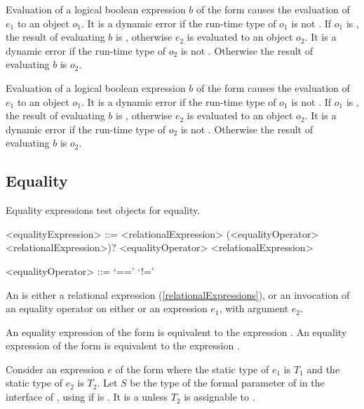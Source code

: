 \documentclass[makeidx]{article}
\begin{document}
\LMHash{}%
Evaluation of a logical boolean expression $b$ of the form
causes the evaluation of $e_1$ to an object $o_1$.
It is a dynamic error if the run-time type of $o_1$ is not .
If $o_1$ is \TRUE, the result of evaluating $b$ is \TRUE,
otherwise $e_2$ is evaluated to an object $o_2$.
It is a dynamic error if the run-time type of $o_2$ is not .
Otherwise the result of evaluating $b$ is $o_2$.

\LMHash{}%
Evaluation of a logical boolean expression $b$ of the form
causes the evaluation of $e_1$ to an object $o_1$.
It is a dynamic error if the run-time type of $o_1$ is not .
If $o_1$ is \FALSE, the result of evaluating $b$ is \FALSE,
otherwise $e_2$ is evaluated to an object $o_2$.
It is a dynamic error if the run-time type of $o_2$ is not .
Otherwise the result of evaluating $b$ is $o_2$.


\subsection{Equality}

\LMHash{}%
Equality expressions test objects for equality.

\begin{grammar}
<equalityExpression> ::= \gnewline{}
  <relationalExpression> (<equalityOperator> <relationalExpression>)?
  \alt \SUPER{} <equalityOperator> <relationalExpression>

<equalityOperator> ::= `=='
  \alt `!='
\end{grammar}

\LMHash{}%
An  is either a relational expression
(\ref{relationalExpressions}),
or an invocation of an equality operator on either \SUPER{}
or an expression $e_1$, with argument $e_2$.

\LMHash{}%
An equality expression of the form  is equivalent to
the expression .
An equality expression of the form  is equivalent to
the expression .

\LMHash{}%
Consider an expression $e$ of the form 
where the static type of $e_1$ is $T_1$
and the static type of $e_2$ is $T_2$.
Let $S$ be the type of the formal parameter of
 in the interface of ,
using  if  is .
It is a  unless $T_2$ is assignable to .
\end{document}
